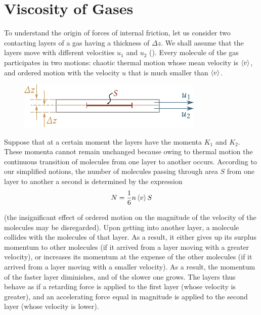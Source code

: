 \section{Viscosity of Gases}\label{sec:16_5}

To understand the origin of forces of internal friction, let us consider two contacting layers of a gas having a thickness of $\Delta z$. We shall
assume that the layers move with different velocities $u_1$ and $u_2$ (). Every molecule of the gas participates in two motions: chaotic thermal motion whose mean velocity is $\left\langle v \right\rangle$, and ordered motion with the velocity $u$ that is much smaller than $\left\langle v \right\rangle$.

\begin{figure}[t]
	\begin{center}
		\includegraphics[scale=1]{figures/ch_16/fig_16_8.pdf}
		\caption[]{}
		\label{fig:16_8}
	\end{center}
	\vspace{-0.8cm}
\end{figure}

Suppose that at a certain moment the layers have the momenta $K_1$ and $K_2$. These momenta cannot remain unchanged because owing to thermal motion the continuous transition of molecules from one layer to another occurs. According to our simplified notions, the number of molecules passing through area $S$ from one layer to another a second is determined by the expression
\begin{equation}\label{eq:16_28}
    N = \frac{1}{6} n \left\langle v \right\rangle S
\end{equation}

\noindent
(the insignificant effect of ordered motion on the magnitude of the velocity of the molecules may be disregarded). Upon getting into another layer, a molecule collides with the molecules of that layer. As a result, it either gives up its surplus momentum to other molecules (if it arrived from a layer moving with a greater velocity), or increases its momentum at the expense of the other molecules (if it arrived from a layer moving with a smaller velocity). As a result, the momentum of the faster layer diminishes, and of the slower one grows. The layers thus behave as if a retarding force is applied to the first layer (whose velocity is greater), and an accelerating force equal in magnitude is applied to the second layer (whose velocity is lower).

